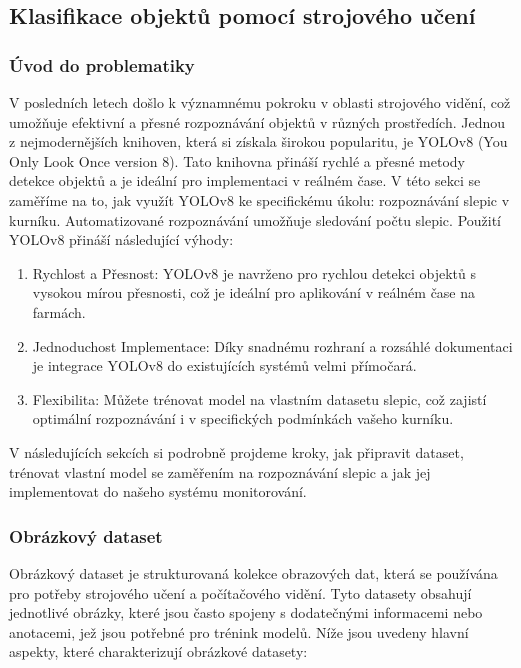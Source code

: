 

\subsection{Klasifikace objektů pomocí strojového učení}\label{subsec:klasifikace-objektu-pomoci-strojoveho-uceni}

\subsubsection{Úvod do problematiky}
V posledních letech došlo k významnému pokroku v oblasti strojového vidění, což umožňuje efektivní a přesné rozpoznávání objektů v různých prostředích.
Jednou z nejmodernějších knihoven, která si získala širokou popularitu, je YOLOv8 (You Only Look Once version 8).
Tato knihovna přináší rychlé a přesné metody detekce objektů a je ideální pro implementaci v reálném čase.
V této sekci se zaměříme na to, jak využít YOLOv8 ke specifickému úkolu: rozpoznávání slepic v kurníku.
Automatizované rozpoznávání umožňuje sledování počtu slepic.
Použití YOLOv8 přináší následující výhody:

\begin{enumerate}
    \item Rychlost a Přesnost: YOLOv8 je navrženo pro rychlou detekci objektů s vysokou mírou přesnosti, což je ideální pro aplikování v reálném čase na farmách.
    \item Jednoduchost Implementace: Díky snadnému rozhraní a rozsáhlé dokumentaci je integrace YOLOv8 do existujících systémů velmi přímočará.
    \item Flexibilita: Můžete trénovat model na vlastním datasetu slepic, což zajistí optimální rozpoznávání i v specifických podmínkách vašeho kurníku.
\end{enumerate}
V následujících sekcích si podrobně projdeme kroky, jak připravit dataset, trénovat vlastní model se zaměřením na rozpoznávání slepic a jak jej implementovat do našeho systému monitorování.

\subsubsection{Obrázkový dataset}

Obrázkový dataset je strukturovaná kolekce obrazových dat, která se používána pro potřeby strojového učení a počítačového vidění.
Tyto datasety obsahují jednotlivé obrázky, které jsou často spojeny s dodatečnými informacemi nebo anotacemi, jež jsou potřebné pro trénink modelů.
Níže jsou uvedeny hlavní aspekty, které charakterizují obrázkové datasety:

